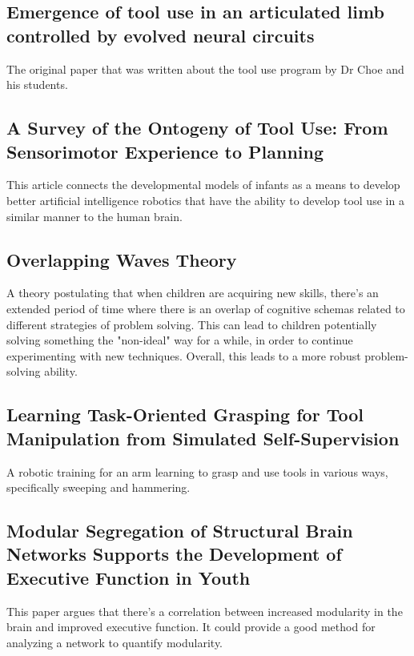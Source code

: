 \documentclass{article}
\begin{document}
\subsection{Emergence of tool use in an articulated limb controlled by evolved neural circuits \cite{li_emergence_2015}}

The original paper that was written about the tool use program by Dr Choe and his students.

\subsection {A Survey of the Ontogeny of Tool Use: From Sensorimotor Experience to Planning \cite{guerin_survey_2013}}

This article connects the developmental models of infants as a means to develop better artificial intelligence robotics that have the ability to develop tool use in a similar manner to the human brain.

\subsection {Overlapping Waves Theory \cite{chen_ii_2000}}
A theory postulating that when children are acquiring new skills, there's an extended period of time where there is an overlap of cognitive schemas related to different strategies of problem solving. This can lead to children potentially solving something the "non-ideal" way for a while, in order to continue experimenting with new techniques. Overall, this leads to a more robust problem-solving ability. 

\subsection{Learning Task-Oriented Grasping for Tool
Manipulation from Simulated Self-Supervision \cite{fang_learning_2018}}

A robotic training for an arm learning to grasp and use tools in various ways, specifically sweeping and hammering.

\subsection{Modular Segregation of Structural Brain Networks Supports the Development of Executive Function in Youth \cite{baum_modular_2017}}

This paper argues that there's a correlation between increased modularity in the brain and improved executive function. It could provide a good method for analyzing a network to quantify modularity. 
\end{document}
